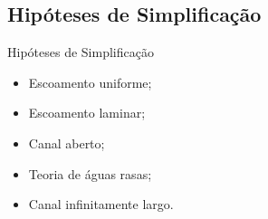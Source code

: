 \subsection{Hipóteses de Simplificação}

\begin{frame}{Hipóteses de Simplificação}
    \begin{itemize}
        \item Escoamento uniforme;
        \item Escoamento laminar;
        \item Canal aberto;
        \item Teoria de águas rasas;
        \item Canal infinitamente largo.
    \end{itemize}
\end{frame}
